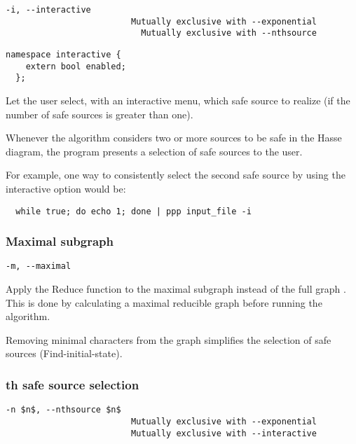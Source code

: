 \begin{lstlisting}[aboveskip=\smallskipamount]
  -i, --interactive
                         Mutually exclusive with --exponential
                           Mutually exclusive with --nthsource
\end{lstlisting}

\begin{lstlisting}[style=c++_block, aboveskip=\smallskipamount]
  namespace interactive {
    extern bool enabled;
  };
\end{lstlisting}

Let the user select, with an interactive menu, which safe source to realize (if the number of safe sources is greater than one).

Whenever the algorithm considers two or more sources to be safe in the Hasse diagram, the program presents a selection of safe sources to the user.

For example, one way to consistently select the second safe source by using the interactive option would be:

\begin{lstlisting}
  while true; do echo 1; done | ppp input_file -i
\end{lstlisting}

\subsubsection*{Maximal subgraph}

\begin{lstlisting}[aboveskip=\smallskipamount]
  -m, --maximal
\end{lstlisting}

Apply the Reduce function to the maximal subgraph \grbcm{} instead of the full graph \grb{}. This is done by calculating a maximal reducible graph before running the algorithm.

Removing minimal characters from the graph simplifies the selection of safe sources (Find-initial-state).

\subsubsection*{th safe source selection}

\begin{lstlisting}[aboveskip=\smallskipamount]
  -n $n$, --nthsource $n$
                         Mutually exclusive with --exponential
                         Mutually exclusive with --interactive
\end{lstlisting}

